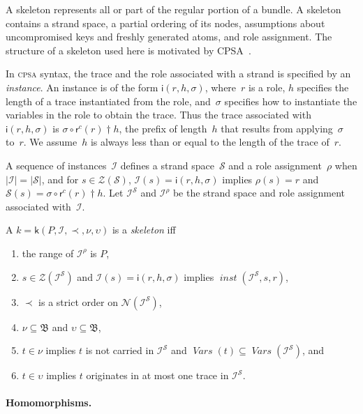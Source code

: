 \documentclass[12pt]{article}
\newcommand{\cpsa}{\textsc{cpsa}}
\newcommand{\fn}[1]{\ensuremath{\operatorname{\mathit{#1}}}}
\newcommand{\vars}{\fn{Vars}}
\newcommand{\prefix}[2]{#1\dagger#2}
\newcommand{\alg}[1]{\ensuremath{\mathfrak{#1}}}
\newcommand{\atm}{\alg{B}}
\newcommand{\ssp}{\ensuremath{\mathcal{S}}}
\newcommand{\strands}{\ensuremath{\mathcal{Z}}}
\newcommand{\nodes}{\ensuremath{\mathcal{N}}}
\newcommand{\rl}{\ensuremath{\rho}}
\newcommand{\skel}{\mathsf{k}}
\newcommand{\insta}{\mathsf{i}}
\newcommand{\insts}{\mathcal{I}}
\newcommand{\role}{\mathsf{r}}
\begin{document}
A skeleton represents all or part of the regular portion of a bundle.
A skeleton contains a strand space, a partial ordering of its nodes,
assumptions about uncompromised keys and freshly generated atoms, and
role assignment.  The structure of a skeleton used here is motivated
by CPSA~\cite{cpsa09}.

In {\cpsa} syntax, the trace and the role associated with a strand is
specified by an \emph{instance}.  An instance is of
the form $\insta(r,h,\sigma)$, where~$r$ is a role, $h$ specifies the
length of a trace instantiated from the role, and~$\sigma$ specifies
how to instantiate the variables in the role to obtain the trace.
Thus the trace associated with $\insta(r,h,\sigma)$ is
$\sigma\circ\prefix{\role^c(r)}{h}$, the prefix of length~$h$ that
results from applying~$\sigma$ to~$r$.  We assume~$h$ is always less
than or equal to the length of the trace of~$r$.

A sequence of instances~$\insts$ defines a strand space~{\ssp} and a
role assignment~{\rl} when $|\insts|=|\ssp|$, and for
$s\in\strands(\ssp)$, $\insts(s)=\insta(r,h,\sigma)$ implies
$\rl(s)=r$ and $\ssp(s)=\sigma\circ\prefix{\role^c(r)}{h}$.  Let
$\insts^\ssp$ and $\insts^{\rl}$ be the strand space and role
assignment associated with~$\insts$.

A $k=\skel(P,\insts,\prec,\nu,\upsilon)$ is a \emph{skeleton} iff
\begin{enumerate}
\item the range of $\insts^{\rl}$ is $P$,
\item $s\in\strands(\insts^\ssp)$ and $\insts(s)=\insta(r,h,\sigma)$
  implies $\fn{inst}(\insts^\ssp, s, r)$,
\item $\prec$ is a strict order on $\nodes(\insts^\ssp)$,
\item $\nu\subseteq\atm$ and $\upsilon\subseteq\atm$,
\item $t\in\nu$ implies $t$ is not carried in $\insts^\ssp$ and
  $\vars(t)\subseteq\vars(\insts^\ssp)$, and
\item $t\in\upsilon$ implies $t$ originates in at most one trace in
  $\insts^\ssp$.
\end{enumerate}

\paragraph{Homomorphisms.}
\end{document}
